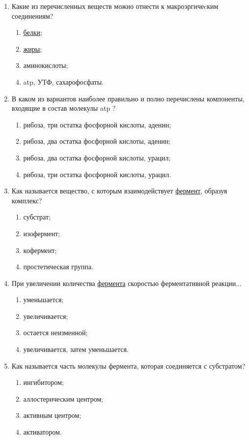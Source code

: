 \begin{enumerate}
\item Какие из перечисленных веществ можно отнести к макроэргичеcким соединениям?
\begin{enumerate}
	\item \hyperlink{proteins}{белки};  
	\item \hyperlink{sect_lipids}{жиры};  
	\item аминокислоты;  
	\item \gls{atp}, УТФ, сахарофосфаты. 
\end{enumerate}

\item В каком из вариантов наиболее правильно и полно перечислены компоненты, входящие в состав молекулы \gls{atp} ?
\begin{enumerate}
	\item рибоза, три остатка фосфорной кислоты, аденин;  
	\item рибоза, два остатка фосфорной кислоты, аденин; 
	\item рибоза, два остатка фосфорной кислоты, урацил;  
	\item рибоза, три остатка фосфорной кислоты, урацил.
\end{enumerate}

\item Как называется вещество, с которым взаимодействует \hyperlink{enzimes}{фермент}, образуя комплекс? 
\begin{enumerate}
	\item субстрат; 
	\item изофермент; 
	\item кофермент; 
	\item простетическая группа.
\end{enumerate}

\item При увеличении количества \hyperlink{enzimes}{фермента} скоростью ферментативной реакции...
\begin{enumerate}
	\item уменьшается; 
	\item увеличивается; 
	\item остается неизменной;
	\item увеличивается, затем уменьшается.
\end{enumerate}

\item Как называется часть молекулы фермента, которая соединяется с субстратом?
\begin{enumerate}
	\item ингибитором;  
	\item аллостерическим центром;  
	\item активным центром; 
	\item активатором.
\end{enumerate}


\end{enumerate}
